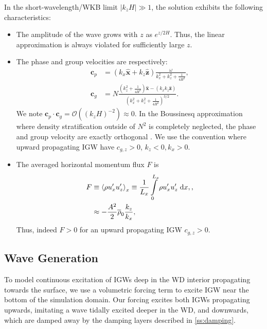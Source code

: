 \documentclass[
        fleqn,
        usenatbib,
    ]{mnras}
\newcommand*{\abs}[1]{\left|#1\right|}
\newcommand*{\ev}[1]{\left\langle#1\right\rangle}
\newcommand*{\p}[1]{\left(#1\right)}
\newcommand*{\bm}[1]{\boldsymbol{\mathbf{#1}}}
\newcommand*{\uv}[1]{\hat{\boldsymbol{\mathbf{#1}}}}
\begin{document}
In the short-wavelength/WKB limit $\abs{k_{z}H} \gg 1$, the solution exhibits
the following characteristics:
\begin{itemize}
    \item The amplitude of the wave grows with $z$ as $e^{z/2H}$. Thus, the
        linear approximation is always violated for sufficiently large $z$.

    \item The phase and group velocities are respectively:
        \begin{align}
            \bm{c}_{p} &=
                \p{k_{x}\uv{x} + k_{z}\uv{z}}\frac{\omega}
                {k_{x}^2 + k_{z}^2 + \frac{1}{4H^2}},\\
            \bm{c}_{g} &= N\frac{\p{k_{z}^2 + \frac{1}{4H^2}}\uv{x}
                - \p{k_{x}k_{z}\uv{z}}}
                {\p{k_{x}^2 + k_{z}^2 + \frac{1}{4H^2}}^{3/2}}.\label{eq:vg}
        \end{align}
        We note $\bm{c}_{p} \cdot \bm{c}_g = \mathcal{O}\p{ \p{k_{z}H}^{-2} }
        \approx 0$. In the Boussinesq approximation where density stratification
        outside of $N^2$ is completely neglected, the phase and group velocity
        are exactly orthogonal \citep{drazin,sutherland1}. We use the convention
        where upward propagating IGW have $c_{g, z} > 0$, $k_z < 0, k_x > 0$.

    \item The averaged horizontal momentum flux $F$ is
        \begin{align}
            F &\equiv \ev{\rho u_{x}' u_{z}'}_x \equiv
                \frac{1}{L_x}\int_0^{L_x}\limits \rho u_{x}'u_{z}'\;\mathrm{d}x,
                    \label{eq:F_def},\\
                &\approx -\frac{A^2}{2}\overline{\rho}_0\frac{k_{z}}{k_{x}},
                    \label{eq:S_lin}
        \end{align}
        Thus, indeed $F > 0$ for an upward propagating IGW $c_{g, z} > 0$.
\end{itemize}

\subsection{Wave Generation}

To model continuous excitation of IGWs deep in the WD interior propagating
towards the surface, we use a volumetric forcing term to excite IGW near the
bottom of the simulation domain. Our forcing excites both IGWs
propagating upwards, imitating a wave tidally excited deeper in the WD, and
downwards, which are damped away by the damping layers described in
\autoref{ss:damping}.
\end{document}
